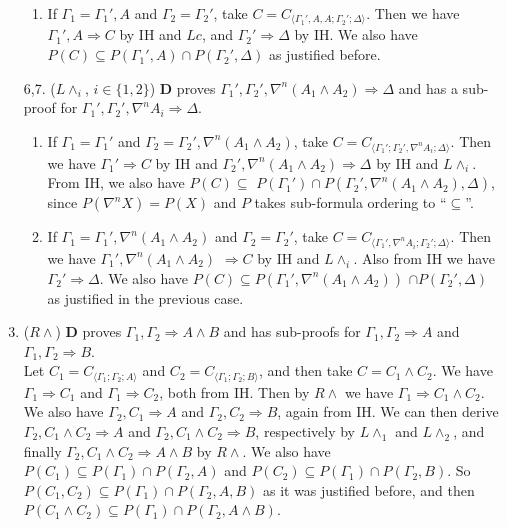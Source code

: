 \begin{enumerate}
\begin{enumerate}
		\item If $\Gamma_1 = \Gamma_1' , A$ and $\Gamma_2 = \Gamma_2'$, take $C = C_{\langle\Gamma_1',A,A;\Gamma_2';\Delta\rangle}$. Then we have $\Gamma_1' , A \Rightarrow C$ by IH and $Lc$, and $\Gamma_2' \Rightarrow \Delta$ by IH. We also have $P(C) \subseteq P(\Gamma_1',A) \cap P(\Gamma_2',\Delta)$ as justified before.
	\end{enumerate}

	\item[6,7.] ($L\land_i$, {\small$i \in \{1,2\}$}) $\mathbf{D}$ proves $\Gamma_1' , \Gamma_2' , \nabla^n (A_1 \land A_2) \Rightarrow \Delta$ and has a sub-proof for $\Gamma_1' , \Gamma_2' , \nabla^n A_i \Rightarrow \Delta$.
	\begin{enumerate}
		\item If $\Gamma_1 = \Gamma_1'$ and $\Gamma_2 = \Gamma_2' , \nabla^n (A_1 \land A_2)$, take $C = C_{\langle\Gamma_1';\Gamma_2',\nabla^n A_i;\Delta\rangle}$. Then we have $\Gamma_1' \Rightarrow C$ by IH and $\Gamma_2' , \nabla^n (A_1 \land A_2) \Rightarrow \Delta$ by IH and $L\land_i$. From IH, we also have $P(C) \subseteq$ $P(\Gamma_1') \cap P(\Gamma_2',\nabla^n(A_1 \land A_2),\Delta)$, since $P(\nabla^n X) = P(X)$ and $P$ takes sub-formula ordering to ``$\subseteq$''.
		
		\item If $\Gamma_1 = \Gamma_1' , \nabla^n (A_1 \land A_2)$ and $\Gamma_2 = \Gamma_2'$, take $C = C_{\langle\Gamma_1',\nabla^n A_i;\Gamma_2';\Delta\rangle}$. Then we have $\Gamma_1' , \nabla^n (A_1 \land A_2)$ $\Rightarrow C$ by IH and $L\land_i$. Also from IH we have $\Gamma_2' \Rightarrow \Delta$. We also have $P(C) \subseteq P(\Gamma_1',\nabla^n (A_1 \land A_2))$ $\cap P(\Gamma_2',\Delta)$ as justified in the previous case.
	\end{enumerate}
	\setcounter{enumi}{7}

	\item ($R\land$) $\mathbf{D}$ proves $\Gamma_1 , \Gamma_2 \Rightarrow A \land B$ and has sub-proofs for $\Gamma_1 , \Gamma_2 \Rightarrow A$ and $\Gamma_1 , \Gamma_2 \Rightarrow B$.\\
	Let $C_1 = C_{\langle\Gamma_1;\Gamma_2;A\rangle}$ and $C_2 = C_{\langle\Gamma_1;\Gamma_2;B\rangle}$, and then take $C = C_1 \land C_2$.
	We have $\Gamma_1 \Rightarrow C_1$ and $\Gamma_1 \Rightarrow C_2$, both from IH. Then by $R\land$ we have $\Gamma_1 \Rightarrow C_1 \land C_2$.
	We also have $\Gamma_2 , C_1 \Rightarrow A$ and $\Gamma_2 , C_2 \Rightarrow B$, again from IH.
	We can then derive $\Gamma_2 , C_1 \land C_2 \Rightarrow A$ and $\Gamma_2 , C_1 \land C_2 \Rightarrow B$, respectively by $L\land_1$ and $L\land_2$, and finally  $\Gamma_2 , C_1 \land C_2 \Rightarrow A \land B$ by $R\land$.
	We also have $P(C_1) \subseteq P(\Gamma_1) \cap P(\Gamma_2 , A)$ and $P(C_2) \subseteq P(\Gamma_1) \cap P(\Gamma_2 , B)$. So $P(C_1 , C_2) \subseteq P(\Gamma_1) \cap P(\Gamma_2 , A , B)$ as it was justified before, and then $P(C_1 \land C_2) \subseteq P(\Gamma_1) \cap P(\Gamma_2 , A \land B)$.
	

\end{enumerate}
